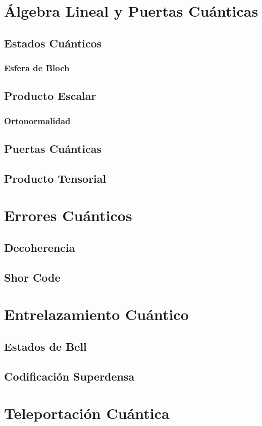 \documentclass{article}
\begin{document}
    \section{Álgebra Lineal y Puertas Cuánticas}
    \subsection{Estados Cuánticos}
    \subsubsection{Esfera de Bloch}    
    \subsection{Producto Escalar}
    \subsubsection{Ortonormalidad}
    \subsection{Puertas Cuánticas}
    \subsection{Producto Tensorial}
    \section{Errores Cuánticos}
    \subsection{Decoherencia}
    \subsection{Shor Code}
    \section{Entrelazamiento Cuántico}
    \subsection{Estados de Bell}
    \subsection{Codificación Superdensa}
    \section{Teleportación Cuántica}
\end{document}
